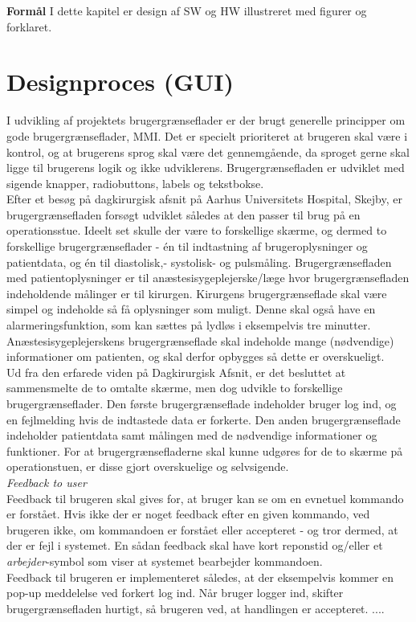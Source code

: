 \textbf{Formål}
I dette kapitel er design af SW og HW illustreret med figurer og forklaret.

\section{Designproces (GUI)}
I udvikling af projektets brugergrænseflader er der brugt generelle principper om gode brugergrænseflader, MMI. Det er specielt prioriteret at brugeren skal være i kontrol, og at brugerens sprog skal være det gennemgående, da sproget gerne skal ligge til brugerens logik og ikke udviklerens. Brugergrænsefladen er udviklet med sigende knapper, radiobuttons, labels og tekstbokse. \\
\newline
Efter et besøg på dagkirurgisk afsnit på Aarhus Universitets Hospital, Skejby, er brugergrænsefladen forsøgt udviklet således at den passer til brug på en operationsstue. Ideelt set skulle der være to forskellige skærme, og dermed to forskellige brugergrænseflader - én til indtastning af brugeroplysninger og patientdata, og én til diastolisk,- systolisk- og pulsmåling. Brugergrænsefladen med patientoplysninger er til anæstesisygeplejerske/læge hvor brugergrænsefladen indeholdende målinger er til kirurgen. Kirurgens brugergrænseflade skal være simpel og indeholde så få oplysninger som muligt. Denne skal også have en alarmeringsfunktion, som kan sættes på lydløs i eksempelvis tre minutter. Anæstesisygeplejerskens brugergrænseflade skal indeholde mange (nødvendige) informationer om patienten, og skal derfor opbygges så dette er overskueligt.\\
Ud fra den erfarede viden på Dagkirurgisk Afsnit, er det besluttet at sammensmelte de to omtalte skærme, men dog udvikle to forskellige brugergrænseflader. Den første brugergrænseflade indeholder bruger log ind, og en fejlmelding hvis de indtastede data er forkerte. Den anden brugergrænseflade indeholder patientdata samt målingen med de nødvendige informationer og funktioner. For at brugergrænsefladerne skal kunne udgøres for de to skærme på operationstuen, er disse gjort overskuelige og selvsigende. \\
\newline
\textit{Feedback to user}\\
Feedback til brugeren skal gives for, at bruger kan se om en evnetuel kommando er forstået. Hvis ikke der er noget feedback efter en given kommando, ved brugeren ikke, om kommandoen er forstået eller accepteret - og tror dermed, at der er fejl i systemet. En sådan feedback skal have kort reponstid og/eller et \textit{arbejder}-symbol som viser at systemet bearbejder kommandoen.\\
Feedback til brugeren er implementeret således, at der eksempelvis kommer en pop-up meddelelse ved forkert log ind. Når bruger logger ind, skifter brugergrænsefladen hurtigt, så brugeren ved, at handlingen er accepteret.  ....  

